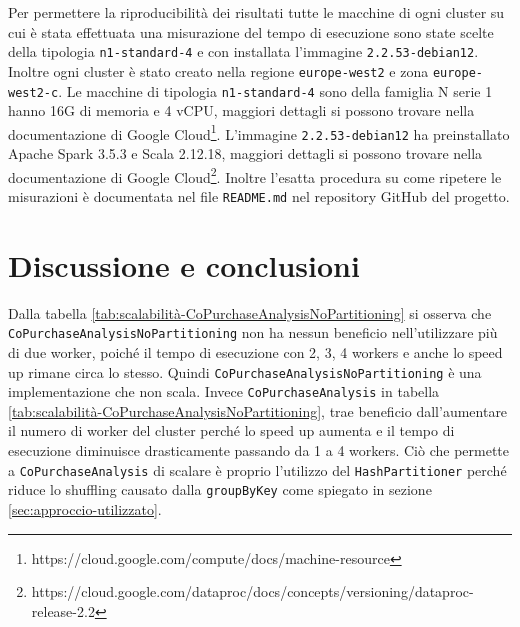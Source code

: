 \documentclass{article}
\begin{document}
Per permettere la riproducibilità dei risultati tutte le macchine di ogni cluster su cui è stata effettuata una misurazione del tempo di esecuzione sono state scelte della tipologia \verb|n1-standard-4| e con installata l'immagine \verb|2.2.53-debian12|.
Inoltre ogni cluster è stato creato nella regione \verb|europe-west2| e zona \verb|europe-west2-c|.
Le macchine di tipologia \verb|n1-standard-4| sono della famiglia N serie 1 hanno 16G di memoria e 4 vCPU, maggiori dettagli si possono trovare nella documentazione di Google Cloud\footnote{https://cloud.google.com/compute/docs/machine-resource}.
L'immagine \verb|2.2.53-debian12| ha preinstallato Apache Spark 3.5.3 e Scala 2.12.18, maggiori dettagli si possono trovare nella documentazione di Google Cloud\footnote{https://cloud.google.com/dataproc/docs/concepts/versioning/dataproc-release-2.2}.
Inoltre l'esatta procedura su come ripetere le misurazioni è documentata nel file \verb|README.md| nel repository GitHub del progetto.

\section{Discussione e conclusioni} \label{sec:discussione-e-conclusioni}

Dalla tabella \ref{tab:scalabilità-CoPurchaseAnalysisNoPartitioning} si osserva che \verb|CoPurchaseAnalysisNoPartitioning| non ha nessun beneficio nell'utilizzare più di due worker, poiché il tempo di esecuzione con 2, 3, 4 workers e anche lo speed up rimane circa lo stesso.
Quindi \verb|CoPurchaseAnalysisNoPartitioning| è una implementazione che non scala.
Invece \verb|CoPurchaseAnalysis| in tabella \ref{tab:scalabilità-CoPurchaseAnalysisNoPartitioning}, trae beneficio dall'aumentare il numero di worker del cluster perché lo speed up aumenta e il tempo di esecuzione diminuisce drasticamente passando da 1 a 4 workers.
Ciò che permette a \verb|CoPurchaseAnalysis| di scalare è proprio l'utilizzo del \verb|HashPartitioner| perché riduce lo shuffling causato dalla \verb|groupByKey| come spiegato in sezione \ref{sec:approccio-utilizzato}.
\end{document}
